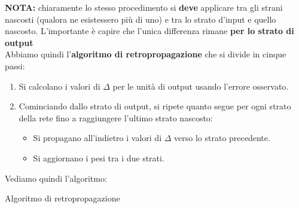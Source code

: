 					   \textbf{NOTA: } chiaramente lo stesso procedimento si \textbf{deve} applicare tra gli strani nascosti (qualora ne esistessero più di uno) e tra lo strato d'input e quello nascosto. L'importante è capire che l'unica differenza rimane \textbf{per lo strato di output}\\
							Abbiamo quindi l'\textbf{algoritmo di retropropagazione} che si divide in cinque
							passi:
							\begin{enumerate}
								\item Si calcolano i valori di $\Delta$ per le unità di output usando l'errore osservato.
								\item Cominciando dallo strato di output, si ripete quanto segue per ogni strato della rete fino a raggiungere l'ultimo strato nascosto:
								\begin{itemize}
								    \item Si propagano all'indietro i valori di $\Delta$ verso lo strato precedente.
								    \item Si aggiornano i pesi tra i due strati.
								\end{itemize}
							\end{enumerate}
							Vediamo quindi l'algoritmo:
							\begin{algorithm}[H]
								\begin{algorithmic}
								    \EndFor
								    \EndFor  
								    
								    \EndFor
								    
								    
								    \EndFor
								    \EndFor
								    \EndFor  
								    \EndFor
								    
									\EndWhile
									\EndFunction
								\end{algorithmic}
								\caption{Algoritmo di retropropagazione}
							\end{algorithm}
